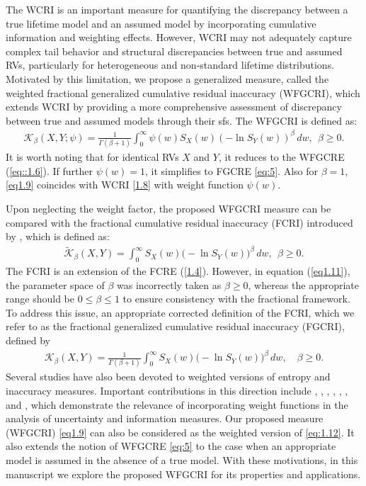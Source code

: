 \documentclass[12pt,a4paper]{article}
\numberwithin{equation}{section}
\begin{document}
The WCRI  is an important measure for quantifying the discrepancy between a true lifetime model and an assumed model by incorporating cumulative information and weighting effects. However, WCRI may not adequately capture complex tail behavior and structural discrepancies between true and assumed RVs, particularly for heterogeneous and non-standard lifetime distributions. Motivated by this limitation, we propose a generalized measure, called the  weighted  fractional generalized cumulative residual inaccuracy (WFGCRI), which extends WCRI by providing a more comprehensive assessment of discrepancy between true and assumed models through their sfs. The WFGCRI is defined as:
\begin{align}\label{eq1.9}
	\mathcal K_\beta(X,Y;\psi)=\frac{1}{\Gamma(\beta+1)}\int_0^\infty \psi(w)S_X(w)(-\ln S_Y(w))^\beta\,dw,~ ~\beta\geq0.
\end{align}
It is worth noting that for identical RVs \(X\) and \(Y\), it reduces to the WFGCRE (\ref{eq::1.6}). If further \(\psi(w)=1\), it simplifies to FGCRE \eqref{eq:5}. Also for \(\beta=1\), \eqref{eq1.9} coincides with WCRI \eqref{1.8} with weight function $\psi(w)$.

Upon neglecting the weight factor, the proposed WFGCRI measure can be compared with the fractional cumulative residual inaccuracy (FCRI) introduced by \cite{Kharb2024}, which is defined as:
\begin{align}\label{eq1.11}
	\tilde{\mathcal{K}}_\beta(X,Y)=\int_0^\infty S_X(w)\big(-\ln S_Y(w)\big)^\beta\,dw, ~~\beta\geq 0.
\end{align}
The FCRI is an extension of the FCRE (\ref{1.4}). However, in  equation (\ref{eq1.11}), the parameter space of $\beta$ was incorrectly taken as $\beta \geq 0$, whereas the appropriate range should be $0 \leq \beta \leq 1$ to ensure consistency with the fractional framework. To address this issue, an appropriate corrected definition of the FCRI, which we refer to as the fractional generalized cumulative residual inaccuracy (FGCRI), defined by
\begin{align}\label{eq:1.12}
	\mathcal{K}_\beta(X,Y)=\frac{1}{\Gamma(\beta+1)}\int_0^\infty S_X(w)\big(-\ln S_Y(w)\big)^\beta\,dw, \quad \beta \geq 0.
\end{align}
Several studies have also been devoted to weighted versions of entropy and inaccuracy measures. Important contributions in this direction include \cite{Kumar2010}, \cite{Mis2011}, \cite{Kundu2014}, \cite{Bara2016}, \cite{Fak2016}, \cite{Kundu2017}, \cite{Tahm2020} and \cite{Kay2023}, which demonstrate the relevance of incorporating weight functions in the analysis of uncertainty and information measures. Our proposed measure (WFGCRI) \eqref{eq1.9} can also be considered as the weighted version of \eqref{eq:1.12}. It also extends the notion of WFGCRE \eqref{eq:5} to the case when an appropriate model is assumed in the absence of a true model. With these motivations, in this manuscript we explore the proposed WFGCRI for its properties and applications.
\end{document}
